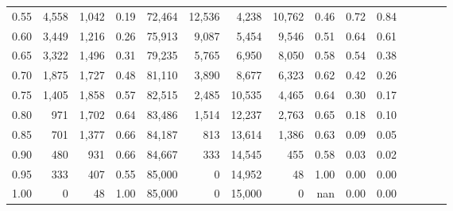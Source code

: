 \begin{tabular}{rrrcrrrrrrrrrrr}
0.55 &   4,558 &  1,042 &                                       0.19 &  72,464 &  12,536 &   4,238 &  10,762 &  0.46 &  0.72 &                         0.84 \\
0.60 &   3,449 &  1,216 &                                       0.26 &  75,913 &   9,087 &   5,454 &   9,546 &  0.51 &  0.64 &                         0.61 \\
0.65 &   3,322 &  1,496 &                                       0.31 &  79,235 &   5,765 &   6,950 &   8,050 &  0.58 &  0.54 &                         0.38 \\
0.70 &   1,875 &  1,727 &                                       0.48 &  81,110 &   3,890 &   8,677 &   6,323 &  0.62 &  0.42 &                         0.26 \\
0.75 &   1,405 &  1,858 &                                       0.57 &  82,515 &   2,485 &  10,535 &   4,465 &  0.64 &  0.30 &                         0.17 \\
0.80 &     971 &  1,702 &                                       0.64 &  83,486 &   1,514 &  12,237 &   2,763 &  0.65 &  0.18 &                         0.10 \\
0.85 &     701 &  1,377 &                                       0.66 &  84,187 &     813 &  13,614 &   1,386 &  0.63 &  0.09 &                         0.05 \\
0.90 &     480 &    931 &                                       0.66 &  84,667 &     333 &  14,545 &     455 &  0.58 &  0.03 &                         0.02 \\
0.95 &     333 &    407 &                                       0.55 &  85,000 &       0 &  14,952 &      48 &  1.00 &  0.00 &                         0.00 \\
1.00 &       0 &     48 &                                       1.00 &  85,000 &       0 &  15,000 &       0 &   nan &  0.00 &                         0.00 \\
\bottomrule
\end{tabular}
